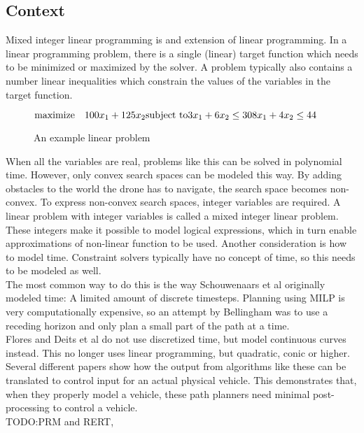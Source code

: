 \subsection{Context}
\label{subsec:previous}
Mixed integer linear programming is and extension of linear programming. In a linear programming problem, there is a single (linear) target function which needs to be minimized or maximized by the solver. A problem typically also contains a number linear inequalities which constrain the values of the variables in the target function.
\begin{figure}[h]
\begin{math}
\text{maximize} \quad 100 x_1 + 125 x_2 \\
\text{subject to} \\
3 x_1 + 6 x_2 \leq 30 \\
8 x_1 + 4 x_2 \leq 44
\end{math}
\caption{An example linear problem}
\end{figure}
When all the variables are real, problems like this can be solved in polynomial time. However, only convex search spaces can be modeled this way. By adding obstacles to the world the drone has to navigate, the search space becomes non-convex. To express non-convex search spaces, integer variables are required\cite{Schouwenaars2001}. A linear problem with integer variables is called a mixed integer linear problem. These integers make it possible to model logical expressions, which in turn enable approximations of non-linear function to be used. Another consideration is how to model time. Constraint solvers typically have no concept of time, so this needs to be modeled as well. \\
The most common way to do this is the way Schouwenaars et al\cite{Schouwenaars2001} originally modeled time: A limited amount of discrete timesteps. Planning using MILP is very computationally expensive, so an attempt by Bellingham\cite{Bellingham2002} was to use a receding horizon and only plan a small part of the path at a time. \\ 
Flores\cite{Flores2007} and Deits et al\cite{Deits2015} do not use discretized time, but model continuous curves instead. This no longer uses linear programming, but quadratic, conic or higher.
\\
Several different papers\cite{Fliess1995a, Hao2005, Cowling2007, Mellinger2011} show how the output from algorithms like these can be translated to control input for an actual physical vehicle. This demonstrates that, when they properly model a vehicle, these path planners need minimal post-processing to control a vehicle. 
\\
TODO:PRM and RERT, 
